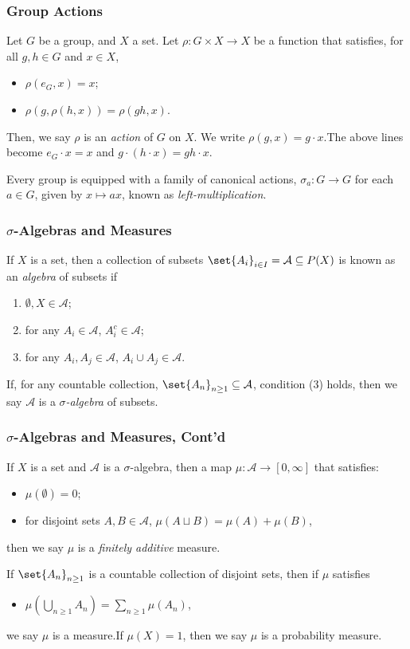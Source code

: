 \documentclass{beamer-custom}
\begin{document}
\begin{frame}
  \frametitle{Group Actions}
  Let $G$ be a group, and $X$ a set. Let $\rho\colon G\times X \rightarrow X$ be a function that satisfies, for all $g,h\in G$ and $x\in X$,\pause
  \begin{itemize}
    \item $\rho\left( e_G, x\right) = x$;\pause
    \item $\rho\left( g,\rho\left( h,x \right) \right) = \rho\left( gh,x \right)$.\pause
  \end{itemize}
  Then, we say $\rho$ is an \textit{action} of $G$ on $X$. We write $\rho\left( g,x \right) = g\cdot x$.\pause\:The above lines become $e_G\cdot x = x$ and $g\cdot \left( h\cdot x \right) = gh\cdot x$.\pause\newline

  Every group is equipped with a family of canonical actions, $\sigma_{a}\colon G\rightarrow G$ for each $a\in G$, given by $x\mapsto ax$, known as \textit{left-multiplication}.
\end{frame}
\begin{frame}
  \frametitle{$\sigma$-Algebras and Measures}
  If $X$ is a set, then a collection of subsets $\set{A_{i}}_{i\in I} = \mathcal{A}\subseteq P(X)$ is known as an \textit{algebra} of subsets if
  \begin{enumerate}
    \item $\emptyset,X\in \mathcal{A}$;
    \item for any $A_i\in \mathcal{A}$, $A_i^{c}\in \mathcal{A}$;
    \item for any $A_i,A_j\in \mathcal{A}$, $A_i\cup A_j\in \mathcal{A}$.
  \end{enumerate}\pause
  If, for any countable collection, $\set{A_n}_{n\geq 1}\subseteq \mathcal{A}$, condition (3) holds, then we say $\mathcal{A}$ is a \textit{$\sigma$-algebra} of subsets.
\end{frame}
\begin{frame}
  \frametitle{$\sigma$-Algebras and Measures, Cont'd}
  If $X$ is a set and $\mathcal{A}$ is a $\sigma$-algebra, then a map $\mu\colon \mathcal{A}\rightarrow [0,\infty]$ that satisfies:
  \begin{itemize}
    \item $\mu\left( \emptyset \right) = 0$;
    \item for disjoint sets $A,B\in \mathcal{A}$, $\mu\left( A\sqcup B \right) = \mu\left( A \right) + \mu\left( B \right)$,
  \end{itemize}
  then we say $\mu$ is a \textit{finitely additive} measure.\pause \newline

  If $\set{A_n}_{n\geq 1}$ is a countable collection of disjoint sets, then if $\mu$ satisfies
  \begin{itemize}
    \item $\displaystyle \mu\left( \bigcup_{n\geq 1}A_n \right) = \sum_{n\geq 1}\mu\left( A_n \right)$,
  \end{itemize}
  we say $\mu$ is a measure.\pause\:If $\mu\left( X \right) = 1$, then we say $\mu$ is a probability measure.
\end{frame}
\end{document}
